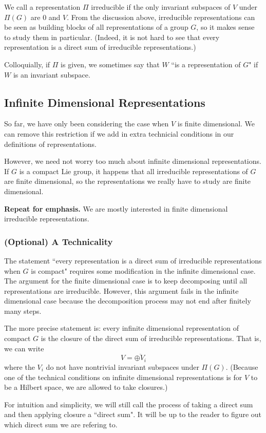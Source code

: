 We call a representation $\Pi$ irreducible if the only invariant subspaces of $V$ under $\Pi(G)$ are 0 and $V$. From the discussion above, irreducible representations can be seen as building blocks of all representations of a group $G$, so it makes sense to study them in particular. (Indeed, it is not hard to see that every representation is a direct sum of irreducible representations.)

Colloquially, if $\Pi$ is given, we sometimes say that $W$ ``is a representation of $G$" if $W$ is an invariant subspace.

\subsection{Infinite Dimensional Representations}
So far, we have only been considering the case when $V$ is finite dimensional. We can remove this restriction if we add in extra technicial conditions in our definitions of representations.

However, we need not worry too much about infinite dimensional representations. If $G$ is a compact Lie group, it happens that all irreducible representations of $G$ are finite dimensional, so the representations we really have to study are finite dimensional.

\textbf{Repeat for emphasis.} We are mostly interested in finite dimensional irreducible representations.

\subsubsection{(Optional) A Technicality}
The statement ``every representation is a direct sum of irreducible representations when $G$ is compact" requires some modification in the infinite dimensional case. The argument for the finite dimensional case is to keep decomposing until all representations are irreducible. However, this argument fails in the infinite dimensional case because the decomposition process may not end after finitely many steps.

The more precise statement is: every infinite dimensional representation of compact $G$ is the closure of the direct sum of irreducible representations. That is, we can write
\[
    V = \overline{\oplus V_i}
\]
where the $V_i$ do not have nontrivial invariant subspaces under $\Pi(G)$. (Because one of the technical conditions on infinite dimensional representations is for $V$ to be a Hilbert space, we are allowed to take closures.)

For intuition and simplicity, we will still call the process of taking a direct sum and then applying closure a ``direct sum". It will be up to the reader to figure out which direct sum we are refering to.

